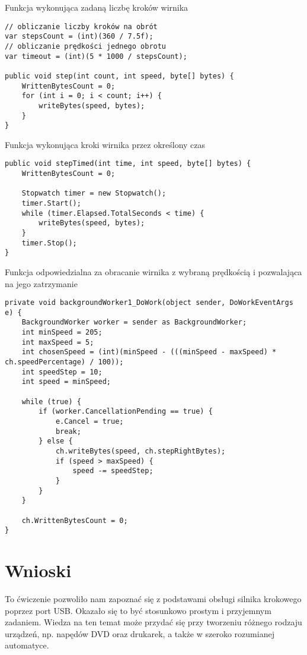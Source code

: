 \documentclass{article}
\begin{document}
\begin{listing}[H]
\caption{Funkcja wykonująca zadaną liczbę kroków wirnika}
\begin{verbatim}
// obliczanie liczby kroków na obrót
var stepsCount = (int)(360 / 7.5f);
// obliczanie prędkości jednego obrotu
var timeout = (int)(5 * 1000 / stepsCount);
            
public void step(int count, int speed, byte[] bytes) {
    WrittenBytesCount = 0;
    for (int i = 0; i < count; i++) {
        writeBytes(speed, bytes);
    }
}
\end{verbatim}
\label{lst:step}
\end{listing}

\begin{listing}[H]
\caption{Funkcja wykonująca kroki wirnika przez określony czas}
\begin{verbatim}
public void stepTimed(int time, int speed, byte[] bytes) {
    WrittenBytesCount = 0;

    Stopwatch timer = new Stopwatch();
    timer.Start();
    while (timer.Elapsed.TotalSeconds < time) {
        writeBytes(speed, bytes);
    }
    timer.Stop();
}
\end{verbatim}
\label{lst:step_timed}
\end{listing}

\begin{listing}[H]
\caption{Funkcja odpowiedzialna za obracanie wirnika z wybraną prędkością i pozwalająca na jego zatrzymanie}
\begin{verbatim}
private void backgroundWorker1_DoWork(object sender, DoWorkEventArgs e) {
    BackgroundWorker worker = sender as BackgroundWorker;
    int minSpeed = 205;
    int maxSpeed = 5;
    int chosenSpeed = (int)(minSpeed - (((minSpeed - maxSpeed) * ch.speedPercentage) / 100));
    int speedStep = 10;
    int speed = minSpeed;

    while (true) {
        if (worker.CancellationPending == true) {
            e.Cancel = true;
            break;
        } else {
            ch.writeBytes(speed, ch.stepRightBytes);
            if (speed > maxSpeed) {
                speed -= speedStep;
            }
        }
    }

    ch.WrittenBytesCount = 0;
}
\end{verbatim}
\label{lst:background_worker}
\end{listing}

\section{Wnioski}
To ćwiczenie pozwoliło nam zapoznać się z podstawami obsługi silnika krokowego poprzez port USB. Okazało się to być stosunkowo prostym i przyjemnym zadaniem. Wiedza na ten temat może przydać się przy tworzeniu różnego rodzaju urządzeń, np. napędów DVD oraz drukarek, a także w szeroko rozumianej automatyce.
\newpage

\listoflistings


\end{document}
